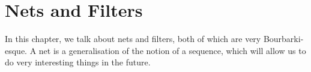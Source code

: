\chapter{Nets and Filters}
\thispagestyle{empty}

In this chapter, we talk about nets and filters, both of which are very Bourbarki-esque. A net is a generalisation of the notion of a sequence, which will allow us to do very interesting things in the future.


